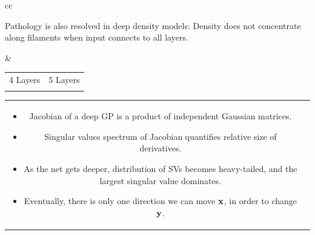 \documentclass[portrait,a0b,final,a4resizeable]{include/a0poster}
\begin{document}
\begin{poster}
\begin{multicols}{2}
\begin{tabular}{cc}
\begin{minipage}[c]{0.45\columnwidth}
Pathology is also resolved in deep density models:  Density does not concentrate along filaments when input connects to all layers.
\end{minipage}
&
\begin{minipage}[c]{0.45\columnwidth}
\centering
\begin{tabular}{cc}
 4 Layers & 5 Layers \\
\gpdrawboxcon{4} &
\gpdrawboxcon{5}
\end{tabular}
\end{minipage}
\end{tabular}






\newcommand{\spectrumpic}[1]{
\texttt{[image: ../figures/spectrum/layer-\#1]}} 


\begin{tabular}{cc}
\begin{minipage}[c]{0.6\columnwidth}


\begin{itemize}
\item Jacobian of a deep GP is a product of independent Gaussian matrices.
\item Singular values spectrum of Jacobian quantifies relative size of derivatives.
\item As the net gets deeper, distribution of SVs becomes heavy-tailed, and the largest singular value dominates.
\item Eventually, there is only one direction we can move $\mathbf{x}$, in order to change $\mathbf{y}$.
\end{itemize}


\end{minipage}
\end{tabular}
\end{multicols}
\end{poster}
\end{document}
